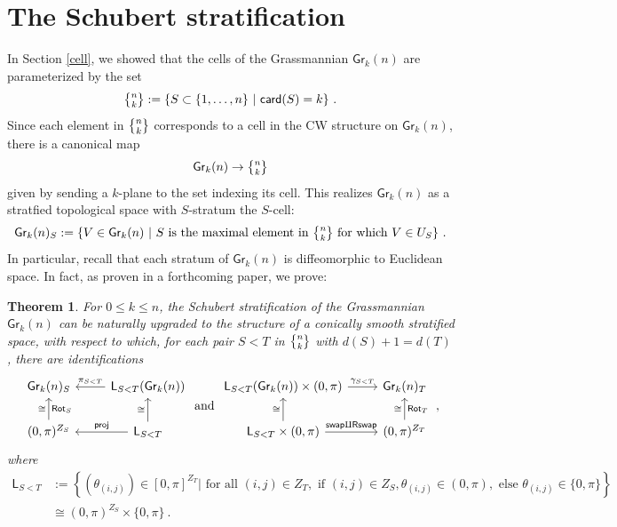 \documentclass{article}
\newcommand{\msf}[1]{\mathsf{#1}}
\newcommand{\gr}{\msf{Gr}}
\newcommand{\nchoosek}{\textstyle\genfrac{\lbrace}{\rbrace}{0pt}{}}
\newcommand{\rot}{\msf{Rot}}
\newcommand{\card}{\msf{card}}
\newtheorem{theorem}{Theorem}[section]
\theoremstyle{definition}
\begin{document}
\section{The Schubert stratification}\label{sec:schubert}
In Section \ref{cell}, we showed that the cells of the Grassmannian $\gr_k(n)$ are parameterized by the set
$$\nchoosek{n}{k}:=\{S \subset \{1,\dots,n\} ~|~ \card(S) = k\}~.$$
Since each element in $\nchoosek{n}{k}$ corresponds to a cell in the CW structure on $\gr_k(n)$, there is a 
canonical map 
$$\gr_k(n) \to \nchoosek{n}{k}$$
given by sending a $k$-plane to the set indexing its
cell. This realizes $\gr_k(n)$ as a stratfied topological space with $S$-stratum the $S$-cell:
$$\gr_k(n)_S := \{ V \in \gr_k(n) ~|~ 
    \text{$S$ is the maximal element in } {\nchoosek{n}{k}} \text{ for which }V \in U_S \} ~.$$
In particular, recall that each stratum of $\gr_k(n)$ is diffeomorphic to Euclidean space. 
In fact, as proven in a forthcoming paper, we prove:
\begin{theorem}\label{conicallySmooth}
    For $0 \le k \le n$, the Schubert stratification of the Grassmannian $\gr_k(n)$ can be naturally upgraded to
    the structure of a conically smooth stratified space, with respect to which, for each pair $S<T$ in 
    $\nchoosek{n}{k}$ with $d(S)+1=d(T)$, there are identifications
    $$\begin{tikzcd}
        \gr_k(n)_S & \msf{L}_{S<T}(\gr_k(n)) \arrow[l,"\pi_{S<T}"'] \\
        (0,\pi)^{Z_S} \arrow[u,"\cong","\rot_S"'] & \msf{L}_{S<T} \arrow[l,"\msf{proj}"'] \arrow[u,"\cong"]
    \end{tikzcd} \text{ and }
    \begin{tikzcd}
        \msf{L}_{S<T}(\gr_k(n)) \times (0,\pi) \arrow[r,"\gamma_{S<T}"] & \gr_k(n)_T \\
        \msf{L}_{S<T} \times (0,\pi) \arrow[u,"\cong"] \arrow[r,"\msf{swap} \amalg \msf{Rswap}"] 
            & (0,\pi)^{Z_T} \arrow[u,"\cong","\rot_T"']
    \end{tikzcd} ~,$$
    where 
    \begin{align*}
        \msf{L}_{S<T} &:= \left\{ \left(\theta_{(i,j)}\right) \in [0,\pi]^{Z_T} \big| \text{ for all } (i,j) \in Z_T, 
        \text{ if } (i,j) \in Z_S, \theta_{(i,j)} \in (0,\pi), \text{ else } \theta_{(i,j)} \in \{0,\pi\} \right\} \\
        &\cong (0,\pi)^{Z_S} \times \{0,\pi\}~.
    \end{align*}
\end{theorem}
\end{document}
